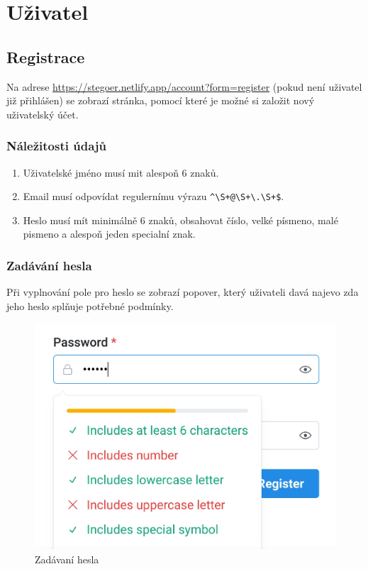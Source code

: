 
\section{Uživatel}\label{sec:uzivatel}

\subsection{Registrace}\label{subsec:registrace}
Na adrese \url{https://stegoer.netlify.app/account?form=register} (pokud není
uživatel již přihlášen) se zobrazí stránka, pomocí které je možné si založit
nový uživatelský účet.

\subsubsection{Náležitosti údajů}\label{subsubsec:naleziosti-udaju}

\begin{enumerate}
    \item Uživatelské jméno musí mit alespoň 6 znaků.
    \item Email musí odpovídat regulernímu výrazu \verb/^\S+@\S+\.\S+$/.
    \item Heslo musí mít minimálně 6 znaků, obsahovat číslo, velké písmeno, malé
    pismeno a alespoň jeden specialní znak.
\end{enumerate}

\subsubsection{Zadávání hesla}\label{subsubsec:zadavani-hesla}

Při vyplnování pole pro heslo se zobrazí popover\cite{enwiki:popover},
který uživateli davá najevo zda jeho heslo splňuje potřebné podmínky.

\begin{figure}
    \centering
    \includegraphics[scale=0.3]{assets/images/password-popover}
    \caption{Zadávaní hesla}\label{fig:zadavani-hesla}
\end{figure}

